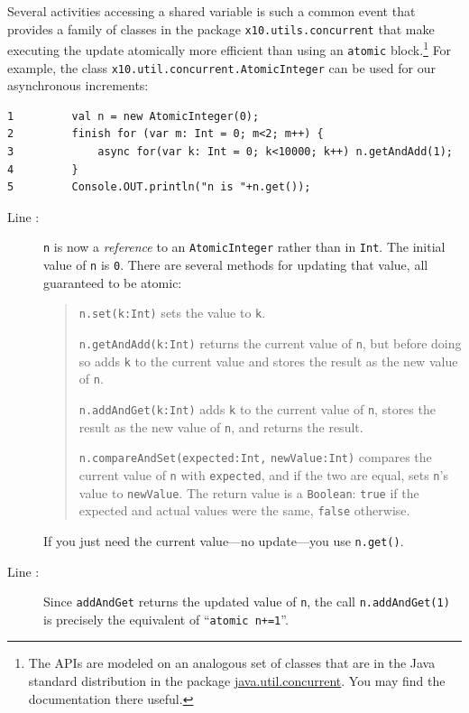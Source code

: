 Several activities accessing a shared variable is such a common event that \Xten{}
provides a family of classes in the package {\tt x10.utils.concurrent} that make
executing the update atomically more
efficient than using an {\tt atomic} block.\footnote{
The APIs are modeled on an analogous set of classes
that are in the Java standard distribution in the package 
\href{http://download.oracle.com/javase/1.5.0/docs/api/java/util/concurrent/atomic/package-summary.html}{java.util.concurrent}.  You may find the documentation there useful.
}
For example,
the class {\tt x10.util.concurrent.AtomicInteger} can be used for our asynchronous
increments:
\begin{verbatim}
1         val n = new AtomicInteger(0); 
2         finish for (var m: Int = 0; m<2; m++) {
3             async for(var k: Int = 0; k<10000; k++) n.getAndAdd(1); 
4         }
5         Console.OUT.println("n is "+n.get());
\end{verbatim}
\begin{description}
\item[Line :]
{\tt n} is now a {\em  reference} to an {\tt AtomicInteger} rather than in {\tt Int}. 
The initial value of {\tt n} is {\tt 0}.  There are several methods for updating
that value, all guaranteed to be atomic:
\begin{quote}
{\tt n.set(k:Int)} sets the value to {\tt k}.

{\tt n.getAndAdd(k:Int)} returns the current value of {\tt n}, but before doing so
adds {\tt k} to the current value and stores the result as the new value of {\tt n}.

{\tt n.addAndGet(k:Int)} adds {\tt k} to the current value of {\tt n}, stores the
result as the new value of {\tt n}, and returns the result.

{\tt n.compareAndSet(expected:Int,} {\tt newValue:Int)} compares the current
value of {\tt n} with {\tt expected}, and if the two are equal, sets 
{\tt n}'s value to {\tt newValue}.  The return value is a {\tt Boolean}:
{\tt true} if the expected and actual values were the same, {\tt false}
otherwise.
\end{quote}
If you just need the current value---no update---you use {\tt n.get()}.
\item[Line :]
Since {\tt addAndGet} returns the updated value of {\tt n}, the call
{\tt n.addAndGet(1)} is precisely the equivalent of ``{\tt atomic n+=1}''.
\end{description}

